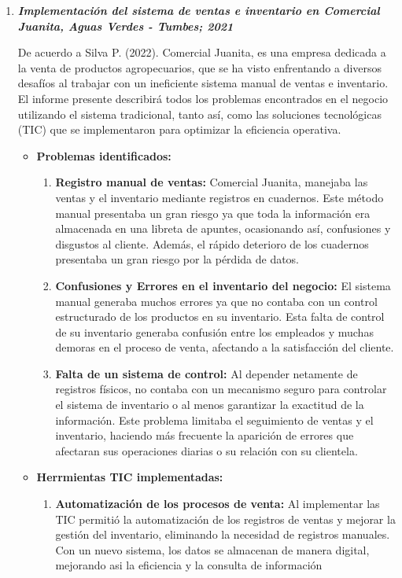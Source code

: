 \documentclass{article}
\begin{document}
\begin{enumerate}
  \item \textbf{\textit{Implementación del sistema de ventas e inventario en Comercial Juanita, Aguas Verdes - Tumbes; 2021}}

  De acuerdo a Silva P. (2022). Comercial Juanita, es una empresa dedicada a la venta de productos agropecuarios, que se ha visto enfrentando a diversos desafíos al trabajar con un ineficiente sistema manual de ventas e inventario. El informe presente describirá todos los problemas encontrados en el negocio utilizando el sistema tradicional, tanto así, como las soluciones tecnológicas (TIC) que se implementaron para optimizar la eficiencia operativa. 
  
  \begin{itemize}
    \item \textbf{Problemas identificados:} 
    \begin{enumerate}
      \item \textbf{Registro manual de ventas:} Comercial Juanita, manejaba las ventas y el inventario mediante registros en cuadernos. Este método manual presentaba un gran riesgo ya que toda la información era almacenada en una libreta de apuntes, ocasionando así, confusiones y disgustos al cliente. Además, el rápido deterioro de los cuadernos presentaba un gran riesgo por la pérdida de datos. 
      \item \textbf{Confusiones y Errores en el inventario del negocio:} El sistema manual generaba muchos errores ya que no contaba con un control estructurado de los productos en su inventario. Esta falta de control de su inventario generaba confusión entre los empleados y muchas demoras en el proceso de venta, afectando a la satisfacción del cliente.   
      \item \textbf{Falta de un sistema de control:} Al depender netamente de registros físicos, no contaba con un mecanismo seguro para controlar el sistema de inventario o al menos garantizar la exactitud de la información. Este problema limitaba el seguimiento de ventas y el inventario, haciendo más frecuente la aparición de errores que afectaran sus operaciones diarias o su relación con su clientela. 
    \end{enumerate}
    \item \textbf{Herrmientas TIC implementadas:}
    \begin{enumerate}
      \item \textbf{Automatización de los procesos de venta:} Al implementar las TIC permitió la automatización de los registros de ventas y mejorar la gestión del inventario, eliminando la necesidad de registros manuales. Con un nuevo sistema, los datos se almacenan de manera digital, mejorando asi la eficiencia y la consulta de información 

\end{enumerate}
\end{itemize}
\end{enumerate}
\end{document}
